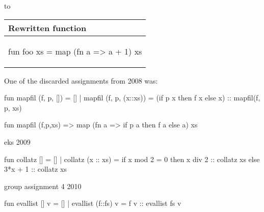 \begin{example}
\noindent
to

\begin{center}
  \begin{tabular}{|l|}
    \hline
    \textbf{Rewritten function} \\ \hline
  \begin{sml}
fun foo xs = map (fn a => a + 1) xs
  \end{sml} \\ \hline
\end{tabular}

\end{center}

\end{example}



\begin{example}
  One of the discarded assignments from 2008 was:

fun mapfil (f, p, []) = []
  | mapfil (f, p, (x::xs)) = (if p x then f x else x) :: mapfil(f, p, xs)



fun mapfil (f,p,xs) => map (fn a => if p a then f a else a) xs

\end{example}


\begin{example}
eks 2009
  \begin{sml}
fun collatz [] = []
  | collatz (x :: xs) = if x mod 2 = 0 then 
                          x div 2 :: collatz xs
                        else 
                          3*x + 1 :: collatz xs
  \end{sml}

\end{example}
group assignment 4 2010
\begin{example}
  \begin{sml}
fun evallist [] v      = []
  | evallist (f::fs) v = f v :: evallist fs v    
  \end{sml}
\end{example}


